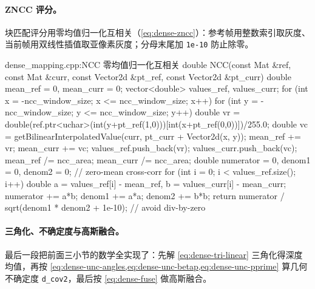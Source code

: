 \paragraph{ZNCC 评分。}
块匹配评分用零均值归一化互相关（\cref{eq:dense-zncc}）：参考帧用整数索引取灰度、当前帧用双线性插值取亚像素灰度；分母末尾加 \texttt{1e-10} 防止除零。

\begin{codebox}[C++]{dense\_mapping.cpp:NCC 零均值归一化互相关}
double NCC(const Mat &ref, const Mat &curr,
           const Vector2d &pt_ref, const Vector2d &pt_curr) {
  double mean_ref = 0, mean_curr = 0;
  vector<double> values_ref, values_curr;
  for (int x = -ncc_window_size; x <= ncc_window_size; x++)
  for (int y = -ncc_window_size; y <= ncc_window_size; y++) {
    double vr = double(ref.ptr<uchar>(int(y+pt_ref(1,0)))[int(x+pt_ref(0,0))])/255.0;
    double vc = getBilinearInterpolatedValue(curr, pt_curr + Vector2d(x, y));
    mean_ref += vr; mean_curr += vc;
    values_ref.push_back(vr); values_curr.push_back(vc);
  }
  mean_ref /= ncc_area; mean_curr /= ncc_area;
  double numerator = 0, denom1 = 0, denom2 = 0;     // zero-mean cross-corr
  for (int i = 0; i < values_ref.size(); i++) {
    double a = values_ref[i] - mean_ref, b = values_curr[i] - mean_curr;
    numerator += a*b; denom1 += a*a; denom2 += b*b;
  }
  return numerator / sqrt(denom1 * denom2 + 1e-10); // avoid div-by-zero
}
\end{codebox}

\paragraph{三角化、不确定度与高斯融合。}
最后一段把前面三小节的数学全实现了：先解 \cref{eq:dense-tri-linear} 三角化得深度均值，再按 \cref{eq:dense-unc-angles,eq:dense-unc-betap,eq:dense-unc-pprime} 算几何不确定度 \texttt{d\_cov2}，最后按 \cref{eq:dense-fuse} 做高斯融合。

